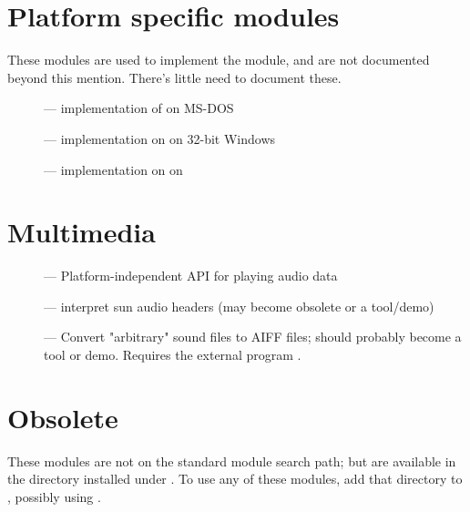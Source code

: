 \section{Platform specific modules}

These modules are used to implement the  module,
and are not documented beyond this mention.  There's little need to
document these.

\begin{description}
\item[]
--- implementation of  on MS-DOS

\item[]
--- implementation on  on 32-bit Windows

\item[]
--- implementation on  on \POSIX{}
\end{description}


\section{Multimedia}

\begin{description}
\item[]
--- Platform-independent API for playing audio data

\item[]
--- interpret sun audio headers (may become obsolete or a tool/demo)

\item[]
--- Convert "arbitrary" sound files to AIFF files; should probably
become a tool or demo.  Requires the external program .
\end{description}


\section{Obsolete}

These modules are not on the standard module search path;
but are available in the directory  installed  under
. %
To use any of these modules, add that directory to ,
possibly using .

